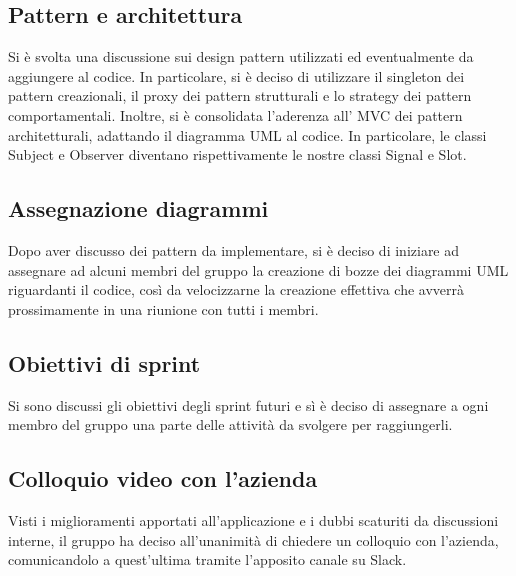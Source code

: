 \subsection{Pattern e architettura}
Si è svolta una discussione sui design pattern utilizzati ed eventualmente da aggiungere al codice. In particolare, si è deciso di utilizzare il singleton dei pattern creazionali,  il proxy dei pattern strutturali e lo strategy dei pattern comportamentali. Inoltre, si è consolidata l'aderenza all' MVC dei pattern architetturali, adattando il diagramma UML al codice. In particolare, le classi Subject e Observer diventano rispettivamente le nostre classi Signal e Slot. 

\subsection{Assegnazione diagrammi}
Dopo aver discusso dei pattern da implementare, si è deciso di iniziare ad assegnare ad alcuni membri del gruppo la creazione di bozze dei diagrammi UML riguardanti il codice, così da velocizzarne la creazione effettiva che avverrà prossimamente in una riunione con tutti i membri.

\subsection{Obiettivi di sprint}
Si sono discussi gli obiettivi degli sprint futuri e sì è deciso di assegnare a ogni membro del gruppo una parte delle attività da svolgere per raggiungerli. 

\subsection{Colloquio video con l'azienda}
Visti i miglioramenti apportati all'applicazione e i dubbi scaturiti da discussioni interne, il gruppo ha deciso all'unanimità di chiedere un colloquio con l'azienda, comunicandolo a quest'ultima tramite l'apposito canale su Slack.

\newpage

